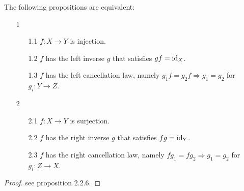 \begin{proposition}
  The following propositions are equivalent:
  \begin{enumerate}
    \item[1]
    \begin{enumerate}
      \item[1.1] $f: X \to Y$ is injection.
      \item[1.2]  $f$ has the left inverse $g$ that satisfies $gf = \operatorname{id}_{X}$.
      \item[1.3] $f$ has the left cancellation law, namely $g_1 f = g_2 f \Rightarrow g_1 = g_2$ for $g_i: Y \to Z$.
    \end{enumerate}
    \item[2]
    \begin{enumerate}
      \item[2.1] $f: X \to Y$ is surjection.
      \item[2.2] $f$ has the right inverse $g$ that satisfies $fg = \operatorname{id}_{Y}$.
      \item[2.3] $f$ has the right cancellation law, namely $fg_1 = fg_2 \Rightarrow g_1 = g_2$ for $g_i: Z \to X$.  
    \end{enumerate}
  \end{enumerate}
\end{proposition}

\begin{proof}
  see \cite{LWW_AJN} proposition 2.2.6.
\end{proof}








